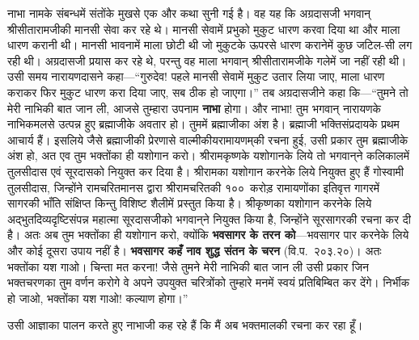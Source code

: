 \begin{sloppypar}\justifying{}
नाभा नामके संबन्धमें संतोंके मुखसे एक और कथा सुनी गई है। वह यह कि अग्रदासजी भगवान् श्रीसीतारामजीकी मानसी सेवा कर रहे थे। मानसी सेवामें प्रभुको मुकुट धारण करवा दिया था और माला धारण करानी थी। मानसी भावनामें माला छोटी थी जो मुकुटके ऊपरसे धारण करानेमें कुछ जटिल-सी लग रही थी। अग्रदासजी प्रयास कर रहे थे, परन्तु वह माला भगवान् श्रीसीतारामजीके गलेमें जा नहीं रही थी। उसी समय नारायणदासने कहा—“गुरुदेव! पहले मानसी सेवामें मुकुट उतार लिया जाए, माला धारण कराकर फिर मुकुट धारण करा दिया जाए, सब ठीक हो जाएगा।” तब अग्रदासजीने कहा कि—“तुमने तो मेरी नाभिकी बात जान ली, आजसे तुम्हारा उपनाम \textbf{नाभा} होगा। और नाभा! तुम भगवान् नारायणके नाभिकमलसे उत्पन्न हुए ब्रह्माजीके अवतार हो। तुममें ब्रह्माजीका अंश है। ब्रह्माजी भक्ति\-संप्रदायके प्रथम आचार्य हैं। इसलिये जैसे ब्रह्माजीकी प्रेरणासे वाल्मीकीय\-रामायणम्‌की रचना हुई, उसी प्रकार तुम ब्रह्माजीके अंश हो, अत एव तुम भक्तोंका ही यशोगान करो। श्रीरामकृष्णके यशोगानके लिये तो भगवान्‌ने कलिकालमें तुलसीदास एवं सूरदासको नियुक्त कर दिया है। श्रीरामका यशोगान करनेके लिये नियुक्त हुए हैं गोस्वामी तुलसीदास, जिन्होंने रामचरितमानस द्वारा श्रीरामचरितकी १००~करोड़ रामायणोंका इतिवृत्त गागरमें सागरकी भाँति संक्षिप्त किन्तु विशिष्ट शैलीमें प्रस्तुत किया है। श्रीकृष्णका यशोगान करनेके लिये अद्भुत\-दिव्यदृष्टि\-संपन्न महात्मा सूरदासजीको भगवान्‌ने नियुक्त किया है, जिन्होंने सूरसागरकी रचना कर दी है। अतः अब तुम भक्तोंका ही यशोगान करो, क्योंकि \textbf{भवसागर के तरन को}—भवसागर पार करनेके लिये और कोई दूसरा उपाय नहीं है। \textbf{भवसागर कहँ नाव शुद्ध संतन के चरन} (वि.प.~२०३.२०)। अतः भक्तोंका यश गाओ। चिन्ता मत करना! जैसे तुमने मेरी नाभिकी बात जान ली उसी प्रकार जिन भक्तचरणका तुम वर्णन करोगे वे अपने उपयुक्त चरित्रोंको तुम्हारे मनमें स्वयं प्रतिबिम्बित कर देंगे। निर्भीक हो जाओ, भक्तोंका यश गाओ! कल्याण होगा।”
\end{sloppypar}
\begin{sloppypar}\justifying{}
उसी आज्ञाका पालन करते हुए नाभाजी कह रहे हैं कि मैं अब भक्तमालकी रचना कर रहा हूँ।
\end{sloppypar}


